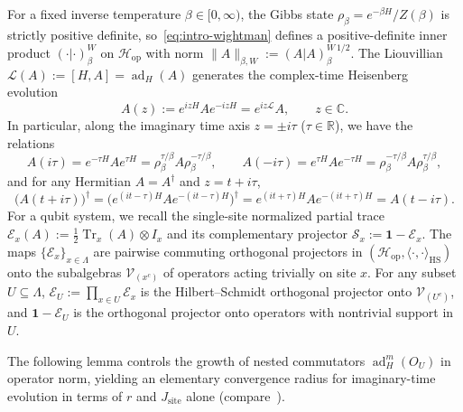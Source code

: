 \documentclass[11pt,a4paper]{article}
\numberwithin{equation}{section}
\theoremstyle{plain}
\theoremstyle{definition}
\newcommand{\Hop}{\mathcal{H}_{\mathrm{op}}}
\newcommand{\HS}{\mathrm{HS}}
\newcommand{\Tr}{\operatorname{Tr}}
\newcommand{\ad}{\operatorname{ad}}
\begin{document}
For a fixed inverse temperature $\beta\in[0,\infty)$, the Gibbs state $\rho_\beta = e^{-\beta H}/Z(\beta)$ is strictly positive definite, so~\eqref{eq:intro-wightman} defines a positive-definite inner product $(\cdot|\cdot)_\beta^W$ on $\Hop$ with norm $\|A\|_{\beta,W} := (A|A)_\beta^{W\,1/2}$. The Liouvillian $\mathcal{L}(A) := [H,A] = \ad_H(A)$ generates the complex-time Heisenberg evolution
\[
  A(z) := e^{izH} A e^{-izH} = e^{iz\mathcal{L}} A, \qquad z\in\mathbb{C}.
\]
In particular, along the imaginary time axis $z = \pm i\tau$ ($\tau\in\mathbb{R}$), we have the relations
\begin{equation}\label{eq:prelim-imag}
  A(i\tau) = e^{-\tau H} A e^{\tau H} = \rho_\beta^{\tau/\beta} A \rho_\beta^{-\tau/\beta}, \qquad
  A(-i\tau) = e^{\tau H} A e^{-\tau H} = \rho_\beta^{-\tau/\beta} A \rho_\beta^{\tau/\beta},
\end{equation}
and for any Hermitian $A = A^\dagger$ and $z = t + i\tau$,
\begin{equation}\label{eq:prelim-adj}
  \bigl(A(t+i\tau)\bigr)^\dagger = \bigl(e^{(it-\tau)H} A e^{-(it-\tau)H}\bigr)^\dagger = e^{(it+\tau)H} A e^{-(it+\tau)H} = A(t-i\tau).
\end{equation}
For a qubit system, we recall the single-site normalized partial trace $\mathcal{E}_x(A) := \frac{1}{2}\Tr_x(A)\otimes I_x$ and its complementary projector $\mathcal{S}_x := \mathbf{1} - \mathcal{E}_x$. The maps $\{\mathcal{E}_x\}_{x\in\Lambda}$ are pairwise commuting orthogonal projectors in $(\Hop,\langle\cdot,\cdot\rangle_\HS)$ onto the subalgebras $\mathcal{V}_{(x^c)}$ of operators acting trivially on site $x$. For any subset $U\subseteq\Lambda$, $\mathcal{E}_U := \prod_{x\in U}\mathcal{E}_x$ is the Hilbert--Schmidt orthogonal projector onto $\mathcal{V}_{(U^c)}$, and $\mathbf{1}-\mathcal{E}_U$ is the orthogonal projector onto operators with nontrivial support in $U$.

The following lemma controls the growth of nested commutators $\ad_H^m(O_U)$ in operator norm, yielding an elementary convergence radius for imaginary-time evolution in terms of $r$ and $J_{\mathrm{site}}$ alone (compare~\cite{Abanin2015,Arad2016}).
\end{document}
